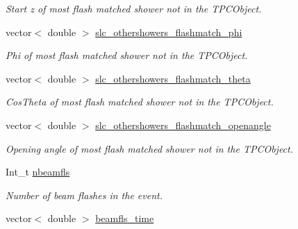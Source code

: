 \begin{DoxyCompactItemize}
\begin{DoxyCompactList}\small\item\em Start z of most flash matched shower not in the T\-P\-C\-Object. \end{DoxyCompactList}\item 
\hypertarget{classUBXSecEvent_acedb7f202a34d1182531876512bb6978}{vector$<$ double $>$ \hyperlink{classUBXSecEvent_acedb7f202a34d1182531876512bb6978}{slc\-\_\-othershowers\-\_\-flashmatch\-\_\-phi}}\label{classUBXSecEvent_acedb7f202a34d1182531876512bb6978}

\begin{DoxyCompactList}\small\item\em Phi of most flash matched shower not in the T\-P\-C\-Object. \end{DoxyCompactList}\item 
\hypertarget{classUBXSecEvent_a75fb77bfd093fbed3509d7e632641cf4}{vector$<$ double $>$ \hyperlink{classUBXSecEvent_a75fb77bfd093fbed3509d7e632641cf4}{slc\-\_\-othershowers\-\_\-flashmatch\-\_\-theta}}\label{classUBXSecEvent_a75fb77bfd093fbed3509d7e632641cf4}

\begin{DoxyCompactList}\small\item\em Cos\-Theta of most flash matched shower not in the T\-P\-C\-Object. \end{DoxyCompactList}\item 
\hypertarget{classUBXSecEvent_ae6dc19d0ebc058c1e4fd363488729d31}{vector$<$ double $>$ \hyperlink{classUBXSecEvent_ae6dc19d0ebc058c1e4fd363488729d31}{slc\-\_\-othershowers\-\_\-flashmatch\-\_\-openangle}}\label{classUBXSecEvent_ae6dc19d0ebc058c1e4fd363488729d31}

\begin{DoxyCompactList}\small\item\em Opening angle of most flash matched shower not in the T\-P\-C\-Object. \end{DoxyCompactList}\item 
\hypertarget{classUBXSecEvent_a2bf72740213db9d50d45c603eb3c549e}{Int\-\_\-t \hyperlink{classUBXSecEvent_a2bf72740213db9d50d45c603eb3c549e}{nbeamfls}}\label{classUBXSecEvent_a2bf72740213db9d50d45c603eb3c549e}

\begin{DoxyCompactList}\small\item\em Number of beam flashes in the event. \end{DoxyCompactList}\item 
\hypertarget{classUBXSecEvent_aff5ca08ec3a193029979e23b73d49d85}{vector$<$ double $>$ \hyperlink{classUBXSecEvent_aff5ca08ec3a193029979e23b73d49d85}{beamfls\-\_\-time}}\label{classUBXSecEvent_aff5ca08ec3a193029979e23b73d49d85}


\end{DoxyCompactItemize}
